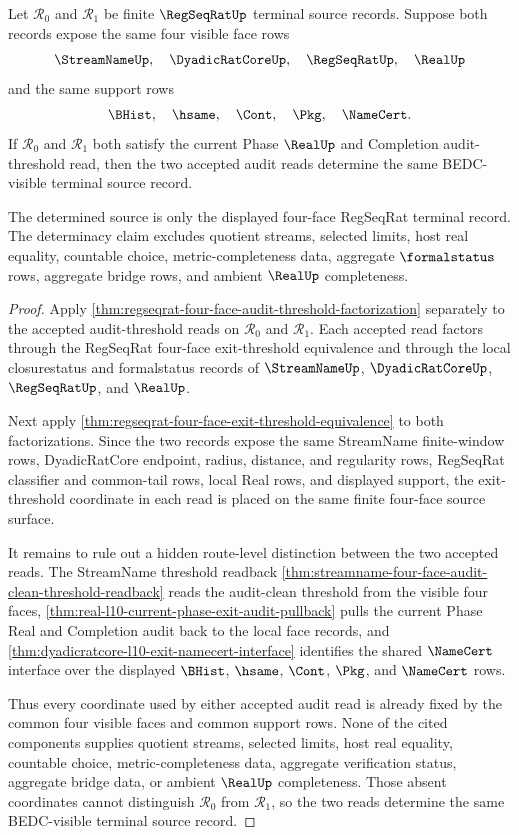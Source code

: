 \begin{theorem}
\label{thm:regseqrat-audit-threshold-determinacy}
Let $\mathcal R_0$ and $\mathcal R_1$ be finite $\RegSeqRatUp$ terminal source records. Suppose both records expose the same four visible face rows
$$
\StreamNameUp,\quad \DyadicRatCoreUp,\quad \RegSeqRatUp,\quad \RealUp
$$
and the same support rows
$$
\BHist,\quad \hsame,\quad \Cont,\quad \Pkg,\quad \NameCert.
$$
If $\mathcal R_0$ and $\mathcal R_1$ both satisfy the current Phase $\RealUp$ and Completion audit-threshold read, then the two accepted audit reads determine the same BEDC-visible terminal source record.

The determined source is only the displayed four-face RegSeqRat terminal record. The determinacy claim excludes quotient streams, selected limits, host real equality, countable choice, metric-completeness data, aggregate $\formalstatus$ rows, aggregate bridge rows, and ambient $\RealUp$ completeness.
\end{theorem}
\begin{proof}
Apply \autoref{thm:regseqrat-four-face-audit-threshold-factorization} separately to the accepted audit-threshold reads on $\mathcal R_0$ and $\mathcal R_1$. Each accepted read factors through the RegSeqRat four-face exit-threshold equivalence and through the local closurestatus and formalstatus records of $\StreamNameUp$, $\DyadicRatCoreUp$, $\RegSeqRatUp$, and $\RealUp$.

Next apply \autoref{thm:regseqrat-four-face-exit-threshold-equivalence} to both factorizations. Since the two records expose the same StreamName finite-window rows, DyadicRatCore endpoint, radius, distance, and regularity rows, RegSeqRat classifier and common-tail rows, local Real rows, and displayed support, the exit-threshold coordinate in each read is placed on the same finite four-face source surface.

It remains to rule out a hidden route-level distinction between the two accepted reads. The StreamName threshold readback \autoref{thm:streamname-four-face-audit-clean-threshold-readback} reads the audit-clean threshold from the visible four faces, \autoref{thm:real-l10-current-phase-exit-audit-pullback} pulls the current Phase Real and Completion audit back to the local face records, and \autoref{thm:dyadicratcore-l10-exit-namecert-interface} identifies the shared $\NameCert$ interface over the displayed $\BHist$, $\hsame$, $\Cont$, $\Pkg$, and $\NameCert$ rows.

Thus every coordinate used by either accepted audit read is already fixed by the common four visible faces and common support rows. None of the cited components supplies quotient streams, selected limits, host real equality, countable choice, metric-completeness data, aggregate verification status, aggregate bridge data, or ambient $\RealUp$ completeness. Those absent coordinates cannot distinguish $\mathcal R_0$ from $\mathcal R_1$, so the two reads determine the same BEDC-visible terminal source record.
\end{proof}

